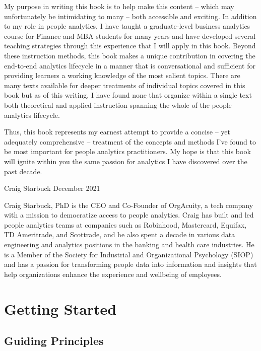 \documentclass[]{book}
\begin{document}
My purpose in writing this book is to help make this content -- which may unfortunately be intimidating to many -- both accessible and exciting. In addition to my role in people analytics, I have taught a graduate-level business analytics course for Finance and MBA students for many years and have developed several teaching strategies through this experience that I will apply in this book. Beyond these instruction methods, this book makes a unique contribution in covering the end-to-end analytics lifecycle in a manner that is conversational and sufficient for providing learners a working knowledge of the most salient topics. There are many texts available for deeper treatments of individual topics covered in this book but as of this writing, I have found none that organize within a single text both theoretical and applied instruction spanning the whole of the people analytics lifecycle.

Thus, this book represents my earnest attempt to provide a concise -- yet adequately comprehensive -- treatment of the concepts and methods I've found to be most important for people analytics practitioners. My hope is that this book will ignite within you the same passion for analytics I have discovered over the past decade.

Craig Starbuck
December 2021

Craig Starbuck, PhD is the CEO and Co-Founder of OrgAcuity, a tech company with a mission to democratize access to people analytics. Craig has built and led people analytics teams at companies such as Robinhood, Mastercard, Equifax, TD Ameritrade, and Scottrade, and he also spent a decade in various data engineering and analytics positions in the banking and health care industries. He is a Member of the Society for Industrial and Organizational Psychology (SIOP) and has a passion for transforming people data into information and insights that help organizations enhance the experience and wellbeing of employees.

\hypertarget{getting-started}{%
\chapter{Getting Started}\label{getting-started}}

\hypertarget{guiding-principles}{%
\section{Guiding Principles}\label{guiding-principles}}
\end{document}
